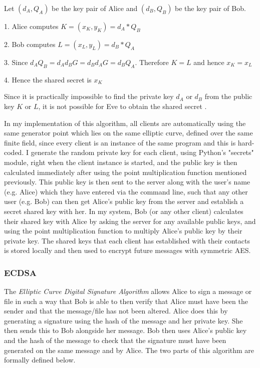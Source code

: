 \documentclass[12pt,a4paper]{article}
\begin{document}
Let $(d_A,Q_A)$ be the key pair of Alice and $(d_B,Q_B)$ be the key pair of Bob.

1. Alice computes $K = (x_K,y_K) = d_A * Q_B$

2. Bob computes $L = (x_L,y_L) = d_B * Q_A$

3. Since $d_AQ_B = d_Ad_BG = d_Bd_AG = d_BQ_A$. Therefore $K = L$ and hence $x_K = x_L$

4. Hence the shared secret is $x_K$

Since it is practically impossible to find the private key $d_A$ or $d_B$ from the public key $K$ or $L$, 
it is not possible for Eve to obtain the shared secret \cite{jurivsic1997elliptic,anoop2007elliptic,silverman2009arithmetic,brown2009standards}. 

In my implementation of this algorithm, all clients are automatically using the same generator point which lies 
on the same elliptic curve, defined over the same finite field, 
since every client is an instance of the same program and this is hard-coded. 
I generate the random private key for each client, using Python's "secrets" module, right when the client instance is started, 
and the public key is then calculated immediately after using the point multiplication function mentioned previously. 
This public key is then sent to the server along with the user's name (e.g. Alice) which they have entered via the command line, 
such that any other user (e.g. Bob) can then get Alice's public key from the server and establish a secret shared key with her. 
In my system, Bob (or any other client) calculates their shared key with Alice by asking the server for any available public keys, 
and using the point multiplication function to multiply Alice's public key by their private key. 
The shared keys that each client has established with their contacts is stored locally 
and then used to encrypt future messages with symmetric AES. 

\subsubsection{ECDSA} \label{ECDSA}
The \emph{Elliptic Curve Digital Signature Algorithm} allows Alice to sign a message or file in such a way that Bob is able to then 
verify that Alice must have been the sender and that the message/file has not been altered. 
Alice does this by generating a signature using the hash of the message and her private key. 
She then sends this to Bob alongside her message. 
Bob then uses Alice's public key and the hash of the message to check that the signature must have been generated on the same message and by Alice. 
The two parts of this algorithm are formally defined below. 
\end{document}
